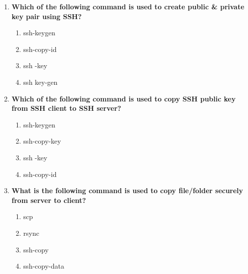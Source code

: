 \begin{flushleft}
\begin{enumerate}
		\item \textbf{Which of the following command is used to create public \& private key pair using SSH?}
		\begin{enumerate}[label=(\alph*)]
			\item ssh-keygen  %
			\item ssh-copy-id
			\item ssh -key
			\item ssh key-gen
		\end{enumerate}
		\bigskip
		\bigskip	
		
		\item \textbf{Which of the following command is used to copy SSH public key from SSH client to SSH server?}
		\begin{enumerate}[label=(\alph*)]
			\item ssh-keygen
			\item ssh-copy-key  
			\item ssh -key
			\item ssh-copy-id    %
		\end{enumerate}
		\bigskip
		\bigskip	

		\item \textbf{What is the following command is used to copy file/folder securely from server to client?}
		\begin{enumerate}[label=(\alph*)]
			\item scp  %
			\item rsync %
			\item ssh-copy
			\item ssh-copy-data   
		\end{enumerate}
		
	\end{enumerate}
\end{flushleft}
